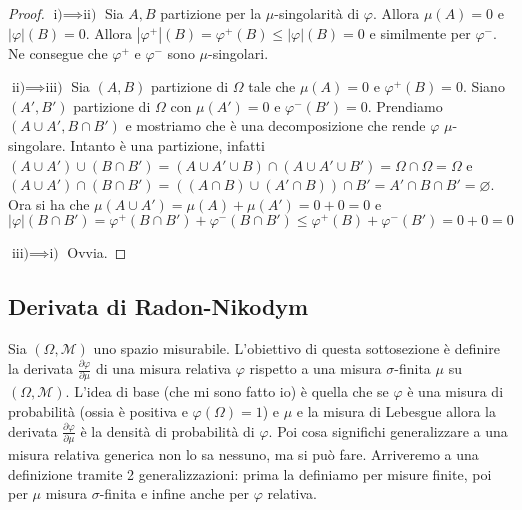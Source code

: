 \begin{proof}
    \(\text{i)} \implies \text{ii)}\) Sia \(A, B\) partizione per la
    \(\mu\)-singolarità di \(\varphi \). Allora \(\mu(A) = 0\) e \(|\varphi|(B)
    = 0\). Allora \(|\varphi ^{+}|(B) = \varphi ^{+}(B) \le |\varphi |(B) = 0\)
    e similmente per \(\varphi^{-}\). Ne consegue che \(\varphi^{+}\) e
    \(\varphi^{-}\) sono \(\mu\)-singolari.

    \(\text{ii)} \implies \text{iii)}\) Sia \((A, B)\) partizione di \(\Omega\)
    tale che \(\mu(A) = 0\) e \(\varphi ^{+}(B) = 0\). Siano \((A', B')\)
    partizione di \(\Omega\) con \(\mu(A') = 0\) e \(\varphi ^{-}(B') = 0\).
    Prendiamo \((A \cup A', B \cap B')\) e mostriamo che è una
    decomposizione che rende \(\varphi \) \(\mu\)-singolare. Intanto è una
    partizione, infatti 
    \((A \cup A') \cup (B \cap B') = (A \cup A' \cup B) \cap (A \cup A' \cup B')
    = \Omega \cap \Omega = \Omega\) e \((A \cup A') \cap (B \cap B') = ((A \cap
    B) \cup (A' \cap B)) \cap B' = A' \cap B \cap B' = \varnothing \). Ora si ha
    che \(\mu(A \cup A') = \mu(A) + \mu(A') = 0 + 0 = 0\) e \(|\varphi |(B \cap
    B') = \varphi ^{+}(B \cap B') + \varphi ^{-} (B \cap B') \le \varphi ^{+}
    (B) + \varphi ^{-} (B') = 0+0 = 0\) 

    \(\text{iii)} \implies \text{i)}\) Ovvia.
\end{proof}

\subsection{Derivata di Radon-Nikodym}
Sia \({(\Omega, \mathcal{M})}\) uno spazio misurabile. L'obiettivo di questa
sottosezione è definire la derivata \(\frac{\partial \varphi }{\partial \mu}\)
di una misura relativa \(\varphi \) rispetto a una misura \(\sigma\)-finita
\(\mu\) su \((\Omega, \mathcal{M})\).
L'idea di base (che mi sono fatto io) è quella che se \(\varphi \) è una misura
di probabilità (ossia è positiva e \(\varphi (\Omega) = 1\)) e \(\mu\) e la misura di
Lebesgue allora la derivata \(\frac{\partial \varphi }{\partial \mu}\) è la
densità di probabilità di \(\varphi\). Poi cosa significhi generalizzare a una
misura relativa generica non lo sa nessuno, ma si può fare.
Arriveremo a una definizione tramite 2
generalizzazioni: prima la definiamo per misure finite, poi per \(\mu\) misura
\(\sigma\)-finita e infine anche per \(\varphi \) relativa. 

